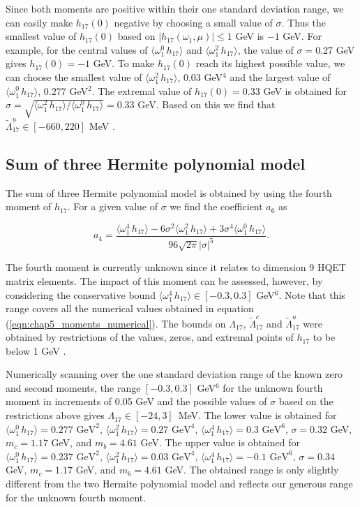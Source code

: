 Since both moments are positive within their one standard deviation range, we can easily make $h_{17}(0)$ negative by choosing a small value of $\sigma$. Thus the smallest value of  $h_{17}(0)$ based on  $|h_{17}(\omega_1,\mu)|\leq1$ GeV is $-1$ GeV. For example, for the central values of $\langle\omega_1^0\,h_{17}\rangle$ and $\langle\omega_1^2\,h_{17}\rangle$, the value of $\sigma=0.27$ GeV gives $h_{17}(0)=-1$ GeV. To make $h_{17}(0)$ reach its highest possible value, we can choose the smallest value of $\langle\omega_1^2\,h_{17}\rangle$, 0.03 GeV$^4$ and the largest value of  $\langle\omega_1^0\,h_{17}\rangle$, 0.277 GeV$^2$. The extremal value of  $h_{17}(0)=0.33$ GeV is obtained for $\sigma =\sqrt{\langle\omega_1^2\,h_{17}\rangle/\langle\omega_1^0\,h_{17}\rangle}=0.33$ GeV. Based on this we find that $\tilde\Lambda_{17}^u\in[-660,220]$ MeV \cite{Gunawardana:2019gep}. 

\subsection{Sum of three Hermite polynomial model}

The sum of three Hermite polynomial model is obtained by using the fourth moment of $h_{17}$. For a given value of $\sigma$ we find the coefficient $a_6$ as \cite{Gunawardana:2019gep}

\begin{equation}\label{a4}
a_4=\frac{\langle\omega_1^4\,h_{17}\rangle-6\sigma^2\langle\omega_1^2\,h_{17}\rangle+3\sigma^4\langle\omega_1^0\,h_{17}\rangle}{96\sqrt{2\pi}|\sigma|^5}.
\end{equation}

The fourth moment is currently unknown since it relates to dimension 9 HQET matrix elements. The impact of this moment can be assessed, however, by considering the conservative bound $\langle\omega_1^4\,h_{17}\rangle\in [-0.3,0.3]$ GeV$^6$. Note that this range covers all  the numerical values obtained in equation (\ref{eqn:chap5_moments_numerical}). The bounds on $\Lambda_{17}$, $\tilde{\Lambda}_{17}^c$ and $\tilde{\Lambda}_{17}^u$ were obtained by restrictions of the values, zeros, and extremal points of $h_{17}$ to be below 1 GeV \cite{Gunawardana:2019gep}.

Numerically scanning over the one standard deviation range of the known zero and second moments, the range $[-0.3,0.3]$ GeV$^6$ for the unknown fourth moment in increments of 0.05 GeV and  the possible values of $\sigma$ based on the restrictions above gives $\Lambda_{17}\in[-24,3]$~MeV. The lower value is obtained for  $\langle\omega_1^0\,h_{17}\rangle=0.277\mbox{ GeV}^2$, $\langle\omega_1^2\,h_{17}\rangle=0.27\mbox{ GeV}^4$, $\langle\omega_1^4\,h_{17}\rangle=0.3\mbox{ GeV}^6$, $\sigma=0.32$ GeV, $m_c=1.17$ GeV, and $m_b=4.61$ GeV. The upper value is obtained for $\langle\omega_1^0\,h_{17}\rangle=0.237\mbox{ GeV}^2$, $\langle\omega_1^2\,h_{17}\rangle=0.03\mbox{ GeV}^4$, $\langle\omega_1^4\,h_{17}\rangle=-0.1\mbox{ GeV}^6$, $\sigma=0.34$ GeV, $m_c=1.17$ GeV, and $m_b=4.61$ GeV. The obtained range is only slightly different from the two Hermite polynomial model and reflects our generous range for the unknown fourth moment. 


